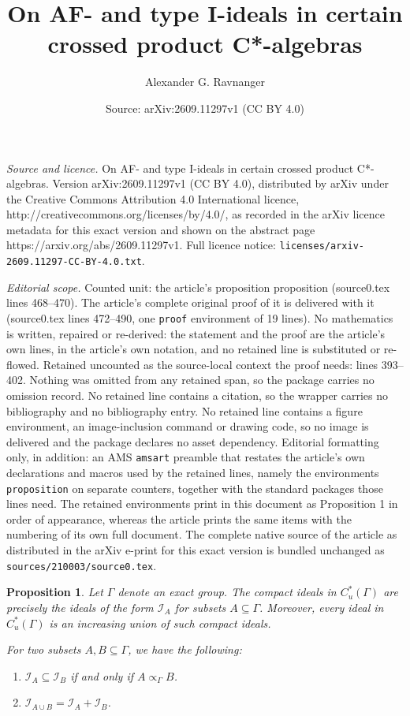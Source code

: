 \documentclass[10pt,a4paper]{amsart}
\title{On AF- and type I-ideals in certain crossed product C*-algebras}
\author{Alexander G. Ravnanger}
\date{Source: arXiv:2609.11297v1 (CC BY 4.0)}
\newtheorem{proposition}{Proposition}
\newcommand{\I}{\mathscr{I}}
\newcommand{\gbd}{\propto_\Gamma}
\begin{document}
\maketitle

\noindent\emph{Source and licence.} On AF- and type I-ideals in certain crossed product C*-algebras. Version arXiv:2609.11297v1 (CC BY 4.0), distributed by arXiv under the Creative Commons Attribution 4.0 International licence, http://creativecommons.org/licenses/by/4.0/, as recorded in the arXiv licence metadata for this exact version and shown on the abstract page https://arxiv.org/abs/2609.11297v1. Full licence notice: \texttt{licenses/arxiv-2609.11297-CC-BY-4.0.txt}.\par\smallskip

\noindent\textit{Editorial scope.} Counted unit: the article's proposition proposition (source0.tex lines 468--470). The article's complete original proof of it is delivered with it (source0.tex lines 472--490, one \texttt{proof} environment of 19 lines). No mathematics is written, repaired or re-derived: the statement and the proof are the article's own lines, in the article's own notation, and no retained line is substituted or re-flowed.  Retained uncounted as the source-local context the proof needs: lines 393--402.  Nothing was omitted from any retained span, so the package carries no omission record.  No retained line contains a citation, so the wrapper carries no bibliography and no bibliography entry.  No retained line contains a figure environment, an image-inclusion command or drawing code, so no image is delivered and the package declares no asset dependency.  Editorial formatting only, in addition: an AMS \texttt{amsart} preamble that restates the article's own declarations and macros used by the retained lines, namely the environments \texttt{proposition} on separate counters, together with the standard packages those lines need.  The retained environments print in this document as Proposition 1 in order of appearance, whereas the article prints the same items with the numbering of its own full document.  The complete native source of the article as distributed in the arXiv e-print for this exact version is bundled unchanged as \texttt{sources/210003/source0.tex}.
	\begin{proposition}
		\label{prop_compact}
		Let \(\Gamma\) denote an exact group. The compact ideals in \(C_u^*(\Gamma)\) are precisely the ideals of the form \(\I_A\) for subsets \(A \subseteq \Gamma\). Moreover, every ideal in \(C_u^*(\Gamma)\) is an increasing union of such compact ideals. 
		
		For two subsets \(A, B \subseteq \Gamma\), we have the following: 
		\begin{enumerate}
			\item \(\I_A \subseteq \I_B\) if and only if \(A \gbd B\). 
			\item \(\I_{A \cup B} = \I_A + \I_B\). 
		\end{enumerate}
	\end{proposition}
\end{document}
